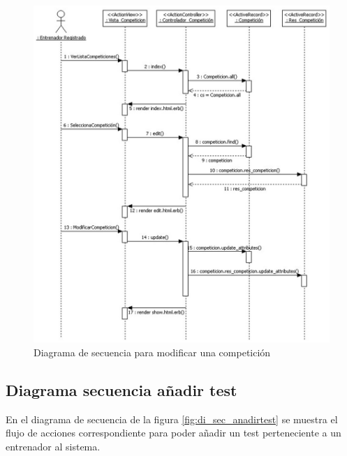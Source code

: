 		  \begin{figure}[H]
			  \centering
			    \includegraphics[width=15cm]{./eps/di_diagsecuencia/Competicion_Modificar.eps}
			  \caption{Diagrama de secuencia para modificar una competición}
			  \label{fig:di_sec_modificarcompeticion}
			\end{figure}
		
		  \newpage
		
		\subsection{Diagrama secuencia añadir test} %
		  \label{sub:diagrama_secuencia_anadir_test}
		
		  En el diagrama de secuencia de la figura \ref{fig:di_sec_anadirtest} se muestra el flujo de acciones correspondiente para poder añadir un test perteneciente a un entrenador al sistema.
		  
